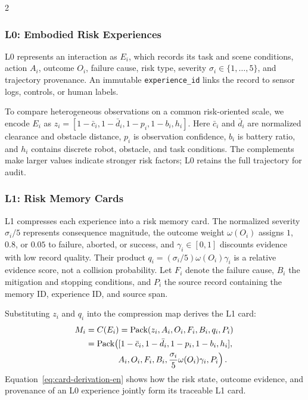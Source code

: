 \documentclass[10pt]{article}
\newcommand{\code}[1]{\texttt{#1}}
\begin{document}
\begin{multicols}{2}
\subsubsection{L0: Embodied Risk Experiences}

L0 represents an interaction as $E_i$, which records its task and scene conditions, action $A_i$, outcome $O_i$, failure cause, risk type, severity $\sigma_i\in\{1,\ldots,5\}$, and trajectory provenance. An immutable \code{experience\_id} links the record to sensor logs, controls, or human labels.

To compare heterogeneous observations on a common risk-oriented scale, we encode $E_i$ as $z_i=[1-\bar c_i,1-\bar d_i,1-p_i,1-b_i,h_i]$. Here $\bar c_i$ and $\bar d_i$ are normalized clearance and obstacle distance, $p_i$ is observation confidence, $b_i$ is battery ratio, and $h_i$ contains discrete robot, obstacle, and task conditions. The complements make larger values indicate stronger risk factors; L0 retains the full trajectory for audit.

\subsubsection{L1: Risk Memory Cards}

L1 compresses each experience into a risk memory card. The normalized severity $\sigma_i/5$ represents consequence magnitude, the outcome weight $\omega(O_i)$ assigns $1$, $0.8$, or $0.05$ to failure, aborted, or success, and $\gamma_i\in[0,1]$ discounts evidence with low record quality. Their product $q_i=(\sigma_i/5)\omega(O_i)\gamma_i$ is a relative evidence score, not a collision probability. Let $F_i$ denote the failure cause, $B_i$ the mitigation and stopping conditions, and $P_i$ the source record containing the memory ID, experience ID, and source span.

Substituting $z_i$ and $q_i$ into the compression map derives the L1 card:
\begin{equation}
\begin{aligned}
M_i&=C(E_i)=\operatorname{Pack}(z_i,A_i,O_i,F_i,B_i,q_i,P_i)\\
&=\operatorname{Pack}\!\left([1-\bar c_i,1-\bar d_i,1-p_i,1-b_i,h_i],\right.\\
&\hspace{3.6em}\left.A_i,O_i,F_i,B_i,
\frac{\sigma_i}{5}\omega(O_i)\gamma_i,P_i\right).
\end{aligned}
\label{eq:card-derivation-en}
\end{equation}
Equation~\eqref{eq:card-derivation-en} shows how the risk state, outcome evidence, and provenance of an L0 experience jointly form its traceable L1 card.


\end{multicols}
\end{document}
